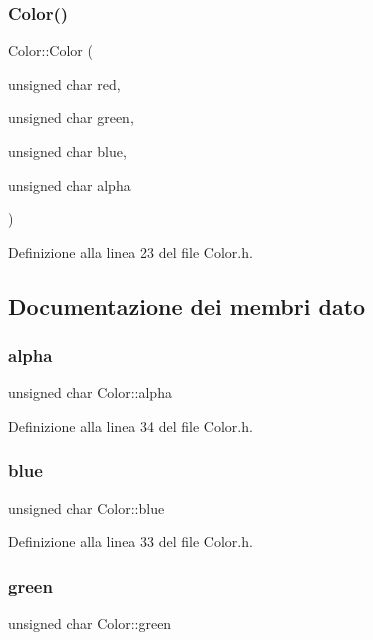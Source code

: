 \subsubsection{\texorpdfstring{Color()}{Color()}}
{\footnotesize\ttfamily Color\+::\+Color (\begin{DoxyParamCaption}\item[{unsigned char}]{red,  }\item[{unsigned char}]{green,  }\item[{unsigned char}]{blue,  }\item[{unsigned char}]{alpha }\end{DoxyParamCaption})\hspace{0.3cm}{\ttfamily [inline]}}



Definizione alla linea 23 del file Color.\+h.



\subsection{Documentazione dei membri dato}
\mbox{\label{struct_color_af485f621e60e201c55e7dae1966bb29f}} 
\subsubsection{\texorpdfstring{alpha}{alpha}}
{\footnotesize\ttfamily unsigned char Color\+::alpha}



Definizione alla linea 34 del file Color.\+h.

\mbox{\label{struct_color_a5b425af958edb0e7835eb08daeb90e71}} 
\subsubsection{\texorpdfstring{blue}{blue}}
{\footnotesize\ttfamily unsigned char Color\+::blue}



Definizione alla linea 33 del file Color.\+h.

\mbox{\label{struct_color_a070831365fe6c626bc0020915a917081}} 
\subsubsection{\texorpdfstring{green}{green}}
{\footnotesize\ttfamily unsigned char Color\+::green}



